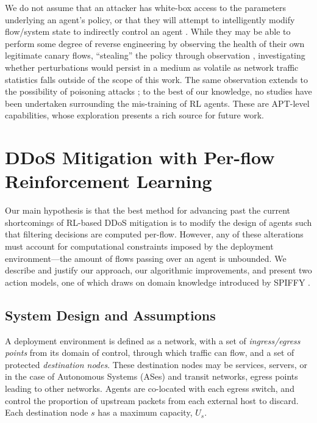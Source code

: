 \documentclass[10pt, times, conference, letterpaper]{IEEEtran}
\begin{document}
We do not assume that an attacker has white-box access to the parameters underlying an agent's policy, or that they will attempt to intelligently modify flow/system state to indirectly control an agent \cite{DBLP:conf/eurosp/PapernotMJFCS16, DBLP:conf/eurosp/PapernotMSW18, DBLP:journals/corr/HuangPGDA17, DBLP:conf/sp/Carlini017}.
While they may be able to perform some degree of reverse engineering by observing the health of their own legitimate canary flows, ``stealing'' the policy through observation \cite{DBLP:conf/uss/TramerZJRR16}, investigating whether perturbations would persist in a medium as volatile as network traffic statistics falls outside of the scope of this work.
The same observation extends to the possibility of poisoning attacks \cite{DBLP:journals/jmlr/KloftL10, DBLP:conf/acsac/ShenTS16}; to the best of our knowledge, no studies have been undertaken surrounding the mis-training of RL agents.
These are APT-level capabilities, whose exploration presents a rich source for future work.

\section{DDoS Mitigation with Per-flow Reinforcement Learning}\label{sec:ddos-mitigation-with-per-flow-reinforcement-learning}
Our main hypothesis is that the best method for advancing past the current shortcomings of RL-based DDoS mitigation is to modify the design of agents such that filtering decisions are computed per-flow.
However, any of these alterations must account for computational constraints imposed by the deployment environment---the amount of flows passing over an agent is unbounded.
We describe and justify our approach, our algorithmic improvements, and present two action models, one of which draws on domain knowledge introduced by SPIFFY \cite{DBLP:conf/ndss/KangGS16}.

\subsection{System Design and Assumptions}
A deployment environment is defined as a network, with a set of \emph{ingress/egress points} from its domain of control, through which traffic can flow, and a set of protected \emph{destination nodes}.
These destination nodes may be services, servers, or in the case of Autonomous Systems (ASes) and transit networks, egress points leading to other networks.
Agents are co-located with each egress switch, and control the proportion of upstream packets from each external host to discard.
Each destination node $s$ has a maximum capacity, $U_s$.
\end{document}
